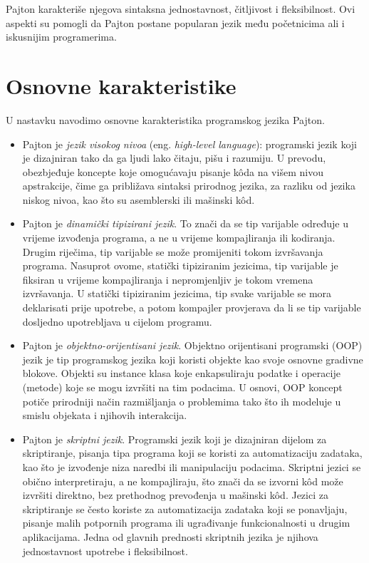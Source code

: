  Pajton karakteriše njegova sintaksna jednostavnost, čitljivost i fleksibi\-lnost. Ovi aspekti su pomogli  da Pajton postane popularan jezik među početnicima ali i iskusnijim  programerima.

\section{Osnovne karakteristike}
U nastavku navodimo osnovne karakteristika programskog jezika Pajton. 

\begin{itemize}
	\item Pajton je \textit{jezik visokog nivoa} (eng. \textit{high-level language}):  programski jezik koji je dizajniran tako da ga ljudi lako čitaju, pišu i razumiju. U prevodu,  obezbjeđuje koncepte koje omogućavaju pisanje k\^oda na višem nivou apstrakcije, čime ga približava sintaksi prirodnog jezika, za razliku od jezika niskog nivoa, kao što su asemblerski ili mašinski k\^od.
	\item Pajton je \textit{dinamički tipizirani jezik}. To znači da  se tip varijable određuje u vrijeme izvođenja programa, a ne u vrijeme kompajliranja ili kodiranja. Drugim riječima, tip varijable se može promijeniti tokom izvršavanja programa. Nasuprot ovome, statički tipiziranim jezicima,  tip varijable je fiksiran u vrijeme kompajliranja i nepromjenljiv je tokom vremena izvršavanja. U statički tipiziranim jezicima,  tip svake varijable se mora deklarisati prije upotrebe, a potom kompajler provjerava da li se tip varijable dosljedno upotrebljava u cijelom progra\-mu.
	\item Pajton je \textit{objektno-orijentisani jezik}.  Objektno orijentisani programski (OOP) jezik  je tip programskog jezika koji koristi objekte kao svoje osnovne gradivne blokove. Objekti su instance klasa koje enkapsuliraju podatke i operacije (metode) koje se mogu izvršiti na tim podacima. U osnovi,  OOP koncept potiče prirodniji način razmišljanja o problemima tako što ih modeluje u smislu objekata i njihovih interakcija.
	\item Pajton je \textit{skriptni jezik}. Programski jezik koji je dizajniran dijelom za  skriptiranje,   pisanja tipa programa koji se koristi za automatizaciju zadataka, kao što je izvođenje niza naredbi ili manipulaciju podacima. Skriptni jezici se obično interpretiraju, a ne kompajliraju, što znači da se izvorni k\^od može izvršiti direktno, bez prethodnog prevođenja u mašinski k\^od.  	Jezici za skriptiranje se često koriste za   automatizacija zadataka koji se ponavljaju, pisanje malih potpornih programa ili ugra\-đivanje funkcionalnosti u drugim aplikacijama. Jedna od glavnih pre\-dnosti skriptnih jezika je njihova jednostavnost upotrebe i fleksibi\-lnost.

\end{itemize}
